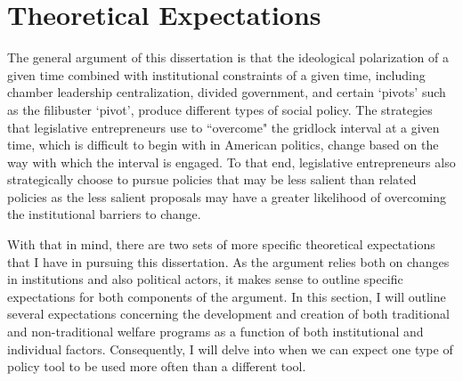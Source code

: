 \documentclass[12pt]{article}
\begin{document}
\section{Theoretical Expectations}

The general argument of this dissertation is that the ideological polarization of a given time combined with institutional constraints of a given time, including chamber leadership centralization, divided government, and certain `pivots' such as the filibuster `pivot', produce different types of social policy. The strategies that legislative entrepreneurs use to ``overcome" the gridlock interval at a given time, which is difficult to begin with in American politics, change based on the way with which the interval is engaged. To that end, legislative entrepreneurs also strategically choose to pursue policies that may be less salient than related policies as the less salient proposals may have a greater likelihood of overcoming the institutional barriers to change.

With that in mind, there are two sets of more specific theoretical expectations that I have in pursuing this dissertation. As the argument relies both on changes in institutions and also political actors, it makes sense to outline specific expectations for both components of the argument. In this section, I will outline several expectations concerning the development and creation of both traditional and non-traditional welfare programs as a function of both institutional and individual factors. Consequently, I will delve into when we can expect one type of policy tool to be used more often than a different tool.
\end{document}
